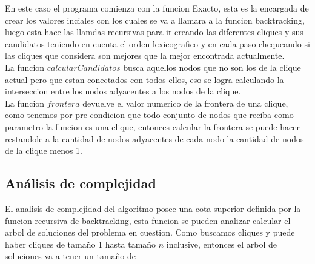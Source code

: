 En este caso el programa comienza con la funcion Exacto, esta es la encargada de crear los valores inciales con los cuales se va a llamara a la funcion backtracking, luego esta hace las llamdas recursivas para ir creando las diferentes cliques y sus candidatos teniendo en cuenta el orden lexicografico y en cada paso chequeando si las cliques que considera son mejores que la mejor encontrada actualmente. \\
La funcion $calcularCandidatos$ busca aquellos nodos que no son los de la clique actual pero que estan conectados con todos ellos, eso se logra calculando la interseccion entre los nodos adyacentes a los nodos de la clique. \\
La funcion $frontera$ devuelve el valor numerico de la frontera de una clique, como tenemos por pre-condicion que todo conjunto de nodos que reciba como parametro la funcion es una clique, entonces calcular la frontera se puede hacer restandole a la cantidad de nodos adyacentes de cada nodo la cantidad de nodos de la clique menos 1. 

\subsection{Análisis de complejidad}

El analisis de complejidad del algoritmo posee una cota superior definida por la funcion recursiva de backtracking, esta funcion se pueden analizar calcular el arbol de soluciones del problema en cuestion. Como buscamos cliques y puede haber cliques de tamaño 1 hasta tamaño $n$ inclusive, entonces el arbol de soluciones va a tener un tamaño de 